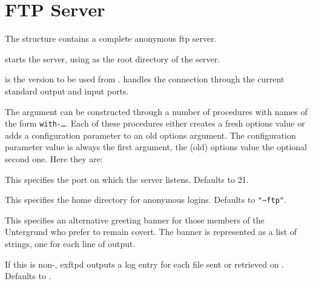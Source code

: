 \chapter{FTP Server}\label{cha:ftpd}

The  structure contains a complete anonymous ftp server.

\begin{desc}
   starts the server, using  as the
  root directory of the server.
  
   is the version to be used from .
   handles the connection through the current standard
  output and input ports.
\end{desc}
%
The  argument can be constructed through a number of
procedures with names of the form \texttt{with-\ldots}.  Each of these
procedures either creates a fresh options value or adds a
configuration parameter to an old options argument.  The configuration
parameter value is always the first argument, the (old) options value
the optional second one.  Here they are:

\begin{desc}
  This specifies the port on which the server listens.  Defaults to 21.
\end{desc}

\begin{desc}
  This specifies the home directory for anonymous logins.  Defaults to
  \verb|"~ftp"|.
\end{desc}

\begin{desc}
  This specifies an alternative greeting banner for those members of
  the Untergrund who prefer to remain covert.  The banner is
  represented as a list of strings, one for each line of output.
\end{desc}

\begin{desc}
  If this is non-\sharpf, ex{ftpd} outputs a log entry for each file
  sent or retrieved on .  Defaults to \sharpf.
\end{desc}

